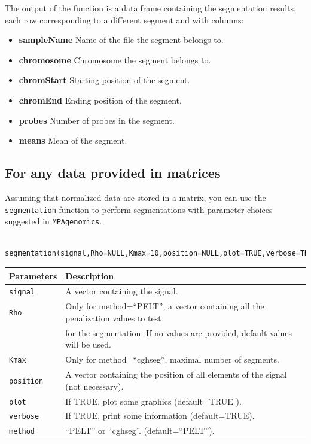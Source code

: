\documentclass[a4paper,10pt]{article}
\begin{document}
			
		The output of the function is a data.frame containing the segmentation results, each row corresponding to a different segment and with columns:
		\begin{itemize}
			\item \textbf{sampleName} Name of the file the segment belongs to.
			\item \textbf{chromosome} Chromosome the segment belongs to.
			\item \textbf{chromStart} Starting position of the segment.
			\item \textbf{chromEnd} Ending position of the segment.
			\item \textbf{probes} Number of probes in the segment.
			\item \textbf{means} Mean of the segment.
		\end{itemize}
			
	\subsection{For any data provided in matrices}	
		Assuming that normalized data are stored in a matrix, you can use the \texttt{segmentation} function to perform segmentations with parameter choices suggested in \texttt{MPAgenomics}.
	
		\begin{verbatim}	
			segmentation(signal,Rho=NULL,Kmax=10,position=NULL,plot=TRUE,verbose=TRUE,method="cghseg")
		\end{verbatim}
	
		\begin{center}
			\begin{tabular}{|l|l|}
				\hline
				Parameters & Description\\
				\hline
				\texttt{signal} & A vector containing the signal.\\
    		\texttt{Rho} & Only for method=``PELT'', a vector containing all the penalization values to test\\
				~ & for the segmentation. If no values are provided, default values will be used.\\
        \texttt{Kmax} & Only for method=``cghseg'', maximal number of segments.\\
				\texttt{position} & A vector containing the position of all elements of the signal (not necessary).\\
				\texttt{plot} & If TRUE, plot some graphics (default=TRUE	).\\
				\texttt{verbose} & If TRUE, print some information (default=TRUE).\\
        \texttt{method} & ``PELT'' or ``cghseg''. (default=``PELT'').\\
				\hline	
			\end{tabular}		
		\end{center}
		
\end{document}
